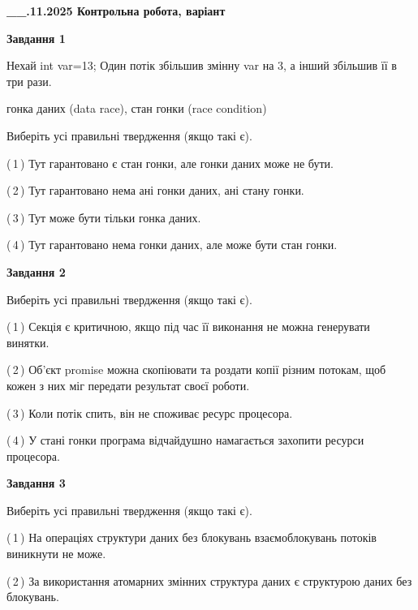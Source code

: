 \documentclass[12pt, ukrainian]{article}
\begin{document}
\begin {large}

\textbf{\_\_.11.2025 Контрольна робота, варіант  }\par


{

\begin{center}
\textbf{Завдання 1}
\end{center}
Нехай int var=13; Один потік збільшив змінну var на 3, а інший збільшив її в три рази.

гонка даних (data race), стан гонки (race condition)

Виберіть усі правильні твердження (якщо такі є).\par
\vspace{2mm}
(\,1\,) Тут гарантовано є стан гонки, але гонки даних може не бути.%

(\,2\,) Тут гарантовано нема ані гонки даних, ані стану гонки.%

(\,3\,) Тут може бути тільки гонка даних.%

(\,4\,) Тут гарантовано нема гонки даних, але може бути стан гонки.%



\begin{center}
\textbf{Завдання 2}
\end{center}
Виберіть усі правильні твердження (якщо такі є).\par
\vspace{2mm}

(\,1\,) Секція є критичною, якщо під час її виконання не можна генерувати винятки.%

(\,2\,) Об’єкт promise можна скопіювати та роздати копії різним потокам, щоб кожен з них міг передати результат своєї роботи.%

(\,3\,) Коли потік спить, він не споживає ресурс процесора.%

(\,4\,) У стані гонки програма відчайдушно намагається захопити ресурси процесора.%



\begin{center}
\textbf{Завдання 3}
\end{center}
Виберіть усі правильні твердження (якщо такі є).\par
\vspace{2mm}

(\,1\,) На операціях структури даних без блокувань взаємоблокувань потоків виникнути не може.%

(\,2\,) За використання атомарних змінних структура даних є структурою даних без блокувань.%

}
\end{large}
\end{document}
